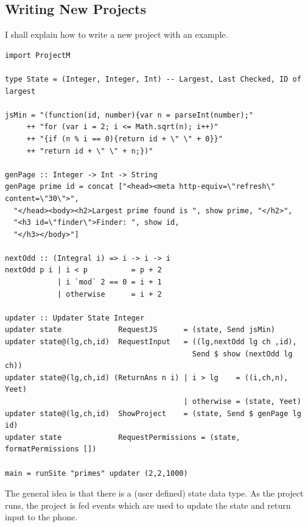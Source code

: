 \documentclass{article}
\begin{document}
\subsection{Writing New Projects}
I shall explain how to write a new project with an example.
\begin{verbatim}
import ProjectM

type State = (Integer, Integer, Int) -- Largest, Last Checked, ID of largest

jsMin = "(function(id, number){var n = parseInt(number);"
     ++ "for (var i = 2; i <= Math.sqrt(n); i++)"
     ++ "{if (n % i == 0){return id + \" \" + 0}}"
     ++ "return id + \" \" + n;})"

genPage :: Integer -> Int -> String
genPage prime id = concat ["<head><meta http-equiv=\"refresh\" content=\"30\">",
  "</head><body><h2>Largest prime found is ", show prime, "</h2>",
  "<h3 id=\"finder\">Finder: ", show id,
  "</h3></body>"]

nextOdd :: (Integral i) => i -> i -> i
nextOdd p i | i < p          = p + 2
            | i `mod` 2 == 0 = i + 1
            | otherwise      = i + 2

updater :: Updater State Integer
updater state             RequestJS      = (state, Send jsMin)
updater state@(lg,ch,id)  RequestInput   = ((lg,nextOdd lg ch ,id), 
                                           Send $ show (nextOdd lg ch))
updater state@(lg,ch,id) (ReturnAns n i) | i > lg    = ((i,ch,n), Yeet)
                                         | otherwise = (state, Yeet) 
updater state@(lg,ch,id)  ShowProject    = (state, Send $ genPage lg id)
updater state             RequestPermissions = (state, formatPermissions [])

main = runSite "primes" updater (2,2,1000)
\end{verbatim}
The general idea is that there is a (user defined) state data type. As the project runs, the project is fed events which
are used to update the state and return input to the phone.
\end{document}
